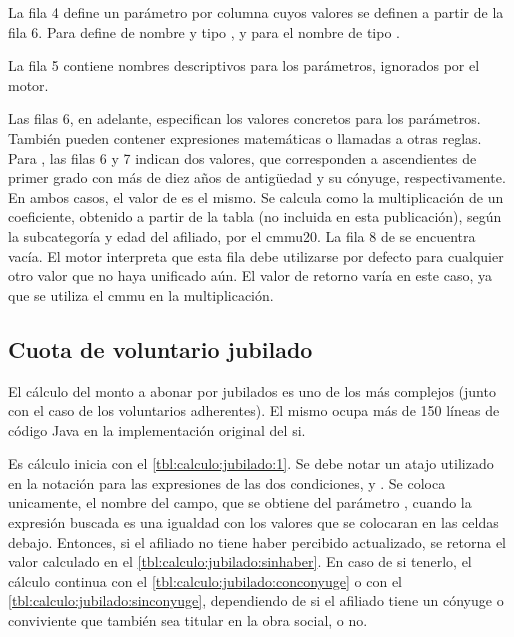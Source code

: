 


La fila 4 define un parámetro por columna cuyos valores se definen a partir de la fila 6.
Para  define de nombre  y tipo , y para  el nombre  de tipo .

La fila 5 contiene nombres descriptivos para los parámetros, ignorados por el motor.

Las filas 6, en adelante, especifican los valores concretos para los parámetros.
También pueden contener expresiones matemáticas o llamadas a otras reglas.
%
Para , las filas 6 y 7 indican dos valores, que corresponden a ascendientes de primer grado con más de diez años de antigüedad y su cónyuge, respectivamente.
En ambos casos, el valor de  es el mismo.
Se calcula como la multiplicación de un coeficiente, obtenido a partir de la tabla  (no incluida en esta publicación), según la subcategoría y edad del afiliado, por el \acrshort{cmmu20}.
%
La fila 8 de  se encuentra vacía.
El motor interpreta que esta fila debe utilizarse por defecto para cualquier otro valor que no haya unificado aún.
El valor de retorno varía en este caso, ya que se utiliza el \acrshort{cmmu} en la multiplicación.

\subsection{Cuota de voluntario jubilado}

El cálculo del monto a abonar por jubilados es uno de los más complejos (junto con el caso de los voluntarios adherentes).
El mismo ocupa más de 150 líneas de código Java en la implementación original del \acrshort{si}.

Es cálculo inicia con el \cref{tbl:calculo:jubilado:1}.
Se debe notar un atajo utilizado en la notación para las expresiones de las dos condiciones,  y .
Se coloca unicamente, el nombre del campo, que se obtiene del parámetro , cuando la expresión buscada es una igualdad con los valores que se colocaran en las celdas debajo.
Entonces, si el afiliado no tiene haber percibido actualizado, se retorna el valor calculado en el \cref{tbl:calculo:jubilado:sinhaber}. 
En caso de si tenerlo, el cálculo continua con el 
\cref{tbl:calculo:jubilado:conconyuge} o con el \cref{tbl:calculo:jubilado:sinconyuge}, dependiendo de si el afiliado tiene un cónyuge o conviviente que también sea titular en la obra social, o no.

